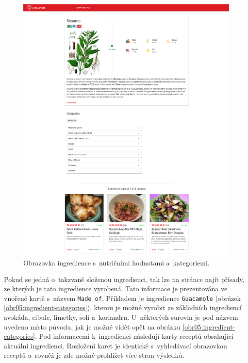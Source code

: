 \begin{figure}[p]\centering
\includegraphics[width=140mm]{../img/ingredient-detail}
\caption{Obrazovka ingredience s~nutričními hodnotami a~kategoriemi.}
\label{obr05:ingredient-detail}
\end{figure}

Pokud se jedná o~takzvaně složenou ingredienci, tak lze na stránce najít přísady, ze kterých je tato ingredience vyrobená. Tato informace je prezentována ve vnořené kartě s~názvem \texttt{Made\,of}. Příkladem je ingredience \texttt{Guacamole} (obrázek \ref{obr05:ingredient-categories}), kterou je možné vyrobit ze základních ingrediencí avokáda, cibule, limetky, soli a~koriandru. U~některých surovin je pod názvem uvedeno místo původu, jak je možné vidět opět na obrázku \ref{obr05:ingredient-categories}. Pod informacemi k~ingredienci následují karty receptů obsahující aktuální ingredienci. Rozložení karet je identické s~vyhledávací obrazovkou receptů a~rovněž je zde možné prohlížet více stran výsledků. 

